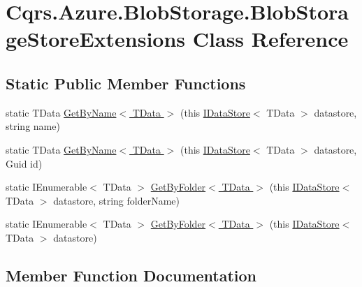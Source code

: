 \hypertarget{classCqrs_1_1Azure_1_1BlobStorage_1_1BlobStorageStoreExtensions}{}\section{Cqrs.\+Azure.\+Blob\+Storage.\+Blob\+Storage\+Store\+Extensions Class Reference}
\label{classCqrs_1_1Azure_1_1BlobStorage_1_1BlobStorageStoreExtensions}
\subsection*{Static Public Member Functions}
\begin{DoxyCompactItemize}
\item 
static T\+Data \hyperlink{classCqrs_1_1Azure_1_1BlobStorage_1_1BlobStorageStoreExtensions_a05556de9a118a0be43dd328b29591d2d}{Get\+By\+Name$<$ T\+Data $>$} (this \hyperlink{interfaceCqrs_1_1DataStores_1_1IDataStore}{I\+Data\+Store}$<$ T\+Data $>$ datastore, string name)
\item 
static T\+Data \hyperlink{classCqrs_1_1Azure_1_1BlobStorage_1_1BlobStorageStoreExtensions_a21e2becce47e62b14f2b6ef659ac646b}{Get\+By\+Name$<$ T\+Data $>$} (this \hyperlink{interfaceCqrs_1_1DataStores_1_1IDataStore}{I\+Data\+Store}$<$ T\+Data $>$ datastore, Guid id)
\item 
static I\+Enumerable$<$ T\+Data $>$ \hyperlink{classCqrs_1_1Azure_1_1BlobStorage_1_1BlobStorageStoreExtensions_a68980261b5e1806826f23e38fcb9a838}{Get\+By\+Folder$<$ T\+Data $>$} (this \hyperlink{interfaceCqrs_1_1DataStores_1_1IDataStore}{I\+Data\+Store}$<$ T\+Data $>$ datastore, string folder\+Name)
\item 
static I\+Enumerable$<$ T\+Data $>$ \hyperlink{classCqrs_1_1Azure_1_1BlobStorage_1_1BlobStorageStoreExtensions_a71348a56844b38342f7d9e6d979fa3f6}{Get\+By\+Folder$<$ T\+Data $>$} (this \hyperlink{interfaceCqrs_1_1DataStores_1_1IDataStore}{I\+Data\+Store}$<$ T\+Data $>$ datastore)
\end{DoxyCompactItemize}


\subsection{Member Function Documentation}
\mbox{\label{classCqrs_1_1Azure_1_1BlobStorage_1_1BlobStorageStoreExtensions_a68980261b5e1806826f23e38fcb9a838}} 
